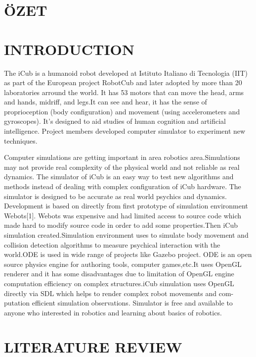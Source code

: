 \documentclass[a4paper, 12pt]{report}
\begin{document}
  \chapter*{ÖZET}
  
  \chapter{INTRODUCTION}
  
  The iCub is a humanoid robot developed at Istituto Italiano di Tecnologia 
  (IIT) 
  as part of the European project RobotCub and later adopted by more than 20 
  laboratories arround the world. It has 53 motors that can move the head, arms 
  and hands, midriff, and legs.It can see and hear, it has the sense of 
  proprioception (body 
  configuration) and movement (using accelerometers and gyroscopes).
  It’s designed to aid studies of human cognition and artificial 
  intelligence. Project members developed computer simulator to experiment new 
  techniques.
  \par Computer simulations are getting important in area robotics 
  area.Simulations may not provide real complexity of the physical world and 
  not 
  reliable as real dynamics. The simulator of iCub is an easy way to test new 
  algorithms and methods instead of dealing with complex configuration of iCub 
  hardware. The simulator is designed to be accurate as real world psychics and 
  dynamics. Development is based on directly from first prototype of simulation 
  environment Webots[1]. Webots was expensive and had limited access to source 
  code which made hard to modify source code in order to add some 
  properties.Then 
  iCub simulation created.Simulation environment uses 
  \cite{ODE} to simulate 
  body movement and collision detection algorithms to measure psychical 
  interaction with the world.ODE is used in wide range of projects like Gazebo 
  project. ODE is an open source physics engine for authoring tools, computer 
  games,etc.It uses OpenGL renderer and it has some disadvantages due to 
  limitation of OpenGL engine computation efficiency on complex structures.iCub 
  simulation uses OpenGL directly via SDL which helps to render complex robot 
  movements and com- putation efficient simulation observations. Simulator is 
  free and available to anyone who interested in robotics and learning about 
  basics of robotics.
  
  
  \chapter{LITERATURE REVIEW}
  
\end{document}

